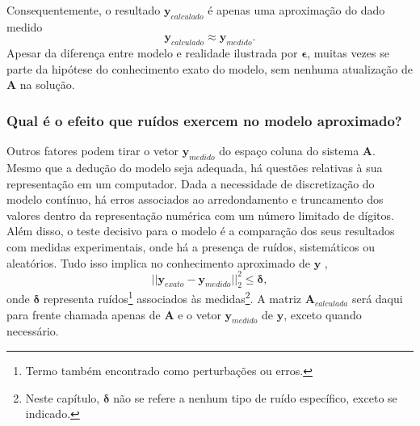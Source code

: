 Consequentemente, o resultado $\mathbf{y}_{calculado}$ é apenas uma aproximação do dado medido
\begin{equation}
\mathbf{y}_{calculado} \approx \mathbf{y}_{medido}.
\label{eq:eq6}
\end{equation}
Apesar da diferença entre modelo e realidade ilustrada por $\bm{\epsilon}$, muitas vezes se parte da hipótese do conhecimento exato do modelo, sem nenhuma atualização de  $\mathbf{A}$ na solução. 

\subsubsection{Qual é o efeito que ruídos exercem no modelo aproximado?}
Outros fatores podem tirar o vetor $\mathbf{y}_{medido}$ do espaço coluna do sistema $\mathbf{A}$. Mesmo que a dedução do modelo seja adequada, há questões relativas à sua representação em um computador. Dada a necessidade de discretização do modelo contínuo, há erros associados ao arredondamento e truncamento dos valores dentro da representação numérica com um número limitado de dígitos. Além disso, o teste decisivo para o modelo é a comparação dos seus resultados com medidas experimentais, onde há a presença de ruídos, sistemáticos ou aleatórios. Tudo isso implica no conhecimento aproximado de $\mathbf{y}$ \cite[pág. 6]{tikhonov1977solutions}, 
\begin{equation}
\label{eq:sistema3}
\vert \vert  \mathbf{y}_{exato} - \mathbf{y}_{medido} \vert \vert^2_2 \leq \bm{\delta},
\end{equation}
onde $\bm{\delta}$ representa ruídos\footnote{Termo também encontrado como perturbações ou erros.}  associados às medidas\footnote{Neste capítulo, $\bm{\delta}$ não se refere a nenhum tipo de ruído específico, exceto se indicado.}. A matriz $\mathbf{A}_{calculada}$ será daqui para frente chamada apenas de $\mathbf{A}$ e o vetor $\mathbf{y}_{medido}$ de $\mathbf{y}$, exceto quando necessário.

